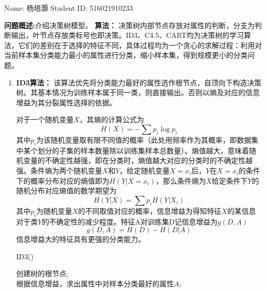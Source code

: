 \documentclass[12pt,a4paper]{article}
\theoremstyle{definition}
\begin{document}
\noindent

\noindent{}
\begin{center}
\footnotesize{\color{black} Name: 杨培灏  \quad Student ID: 516021910233}
\end{center}

\textbf{问题概述:}介绍决策树模型。
\textbf{算法：}
	决策树内部节点存放对属性的判断，分支为判断输出，叶节点存放类标号也即决策。ID3、C4.5、CART均为决策树的学习算法，它们的差别在于选择的特征不同，具体过程均为一个贪心的求解过程：利用对当前样本集分类能力最小的属性进行分类，缩小样本集，得到规模更小的分类问题。
\begin{enumerate}
	\item{
		\textbf{ID3算法：}
		该算法优先将分类能力最好的属性选作根节点，自顶向下构造决策树。其基本情况为训练样本属于同一类，则直接输出。否则以熵及对应的信息增益为其分裂属性选择的依据。
		
		对于一个随机变量$X$，其熵的计算公式为
		$$H(X)=-\sum{p_i\log p_i}$$
		其中$p_i$为该随机变量取有限不同值的概率（此处用频率作为其概率，即数据集中某个划分的子集的样本数量除以训练集样本总数量）。熵值越大，意味着随机变量的不确定性越强，即在分类时，熵值越大对应的分类时的不确定性越强。条件熵为两个随机变量$X$和$Y$，给定随机变量$X=x_i$后，$Y$在$X=x_i$的条件下的概率分布对应的熵值即为$H(Y|X=x_i)$，那么条件熵为$X$给定条件下$Y$的随机分布对应熵值的数学期望为
		$$H(Y|X)=\sum{p_iH(Y|X_i)}$$
		其中$p_i$为随机变量$X$的不同取值对应的概率，信息增益为得知特征$X$的某信息对于类$Y$的不确定性的减少程度。特征A对训练集D记信息增益为$g(D,A)$
		$$g(D,A)=H(D)-H(D|A)$$
		信息增益大的特征具有更强的分类能力。
		
		\begin{algorithm}
			\caption{ID3()}
			创建树的根节点;\\
			根据信息增益，求出属性中对样本分类最好的属性$A$;\\
			

\end{algorithm}}
\end{enumerate}
\end{document}
